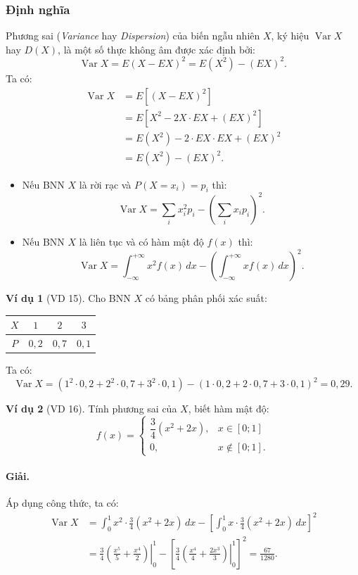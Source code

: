 \documentclass[12pt,a4paper]{article}
\theoremstyle{definition}
\newtheorem{vidu}{Ví dụ}[section]
\begin{document}
\subsubsection{Định nghĩa}
Phương sai (\textit{Variance} hay \textit{Dispersion}) của biến ngẫu nhiên $X$, ký hiệu $\operatorname{Var} X$ hay $D(X)$, là một số thực không âm được xác định bởi:
\[
\operatorname{Var} X = E(X - EX)^2 = E(X^2) - (EX)^2.
\]
Ta có:
\begin{align*}
\operatorname{Var} X &= E\left[(X - EX)^2\right] \\
&= E\left[X^2 - 2X \cdot EX + (EX)^2\right] \\
&= E(X^2) - 2 \cdot EX \cdot EX + (EX)^2 \\
&= E(X^2) - (EX)^2.
\end{align*}

\begin{itemize}
    \item Nếu BNN $X$ là rời rạc và $P(X = x_i) = p_i$ thì:
    \[
    \operatorname{Var} X = \sum_i x_i^2 p_i - \left(\sum_i x_i p_i\right)^2.
    \]
    \item Nếu BNN $X$ là liên tục và có hàm mật độ $f(x)$ thì:
    \[
    \operatorname{Var} X = \int_{-\infty}^{+\infty} x^2 f(x)\,dx - \left(\int_{-\infty}^{+\infty} x f(x)\,dx\right)^2.
    \]
\end{itemize}

\begin{vidu}[VD 15]
Cho BNN $X$ có bảng phân phối xác suất:
\begin{center}
\begin{tabular}{|c|c|c|c|}
\hline
$X$ & $1$ & $2$ & $3$ \\
\hline
$P$ & $0{,}2$ & $0{,}7$ & $0{,}1$ \\
\hline
\end{tabular}
\end{center}
Ta có:
\[
\operatorname{Var} X = (1^2 \cdot 0{,}2 + 2^2 \cdot 0{,}7 + 3^2 \cdot 0{,}1) - (1 \cdot 0{,}2 + 2 \cdot 0{,}7 + 3 \cdot 0{,}1)^2 = 0{,}29.
\]
\end{vidu}

\begin{vidu}[VD 16]
Tính phương sai của $X$, biết hàm mật độ:
\[
f(x) = \begin{cases}
\dfrac{3}{4}(x^2 + 2x), & x \in [0; 1] \\
0, & x \notin [0; 1].
\end{cases}
\]

\paragraph{Giải.} Áp dụng công thức, ta có:
\begin{align*}
\operatorname{Var} X &= \int_0^1 x^2 \cdot \frac{3}{4}(x^2 + 2x)\,dx - \left[\int_0^1 x \cdot \frac{3}{4}(x^2 + 2x)\,dx\right]^2 \\
&= \frac{3}{4} \left.\left(\frac{x^5}{5} + \frac{x^4}{2}\right)\right|_0^1 - \left[\frac{3}{4} \left.\left(\frac{x^4}{4} + \frac{2x^3}{3}\right)\right|_0^1\right]^2 = \frac{67}{1280}.
\end{align*}
\end{vidu}
\end{document}
